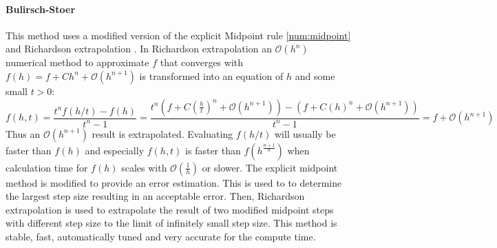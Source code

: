 \documentclass[Master]{subfiles}
\begin{document}
\paragraph {Bulirsch-Stoer }\label{num:Bulirsch-Stoer}
This method \cite{bulirsch1966numerical} uses a modified version of the explicit Midpoint rule \eqref{num:midpoint} and Richardson extrapolation \cite{richardson1927viii}.
In Richardson extrapolation an $\mathcal{O}(h^{n})$  numerical method to approximate $f$  that converges with $f(h) = f+ Ch^n + \mathcal{O}(h^{n+1})$ is transformed into an equation of $h$ and some small $t>0$:
$$f(h,t) = \frac{t^n f(h/t)-f(h)}{t^n-1} = \frac{t^n(f + C(\frac{h}{t})^n + \mathcal{O}(h^{n+1}))-(f + C(h)^n + \mathcal{O}(h^{n+1}))}{t^n -1} = f+\mathcal{O}(h^{n+1})$$
 Thus an $\mathcal{O}(h^{n+1})$ result is extrapolated. Evaluating $f(h/t)$ will usually be faster than $f(h)$ and especially $f(h,t)$ is faster than $f(h^{\frac{n +1}{n}})$ when calculation time for $f(h)$ scales with $\mathcal{O}(\frac{1}{h})$ or slower.
The explicit midpoint method is modified to provide an error estimation. This is used to to determine the largest step size resulting in an acceptable error.
Then, Richardson extrapolation is used to extrapolate the result of two modified midpoint steps with different step size to the limit of infinitely small step size.
This method is stable, fast, automatically tuned and very accurate for the compute time.
\end{document}
